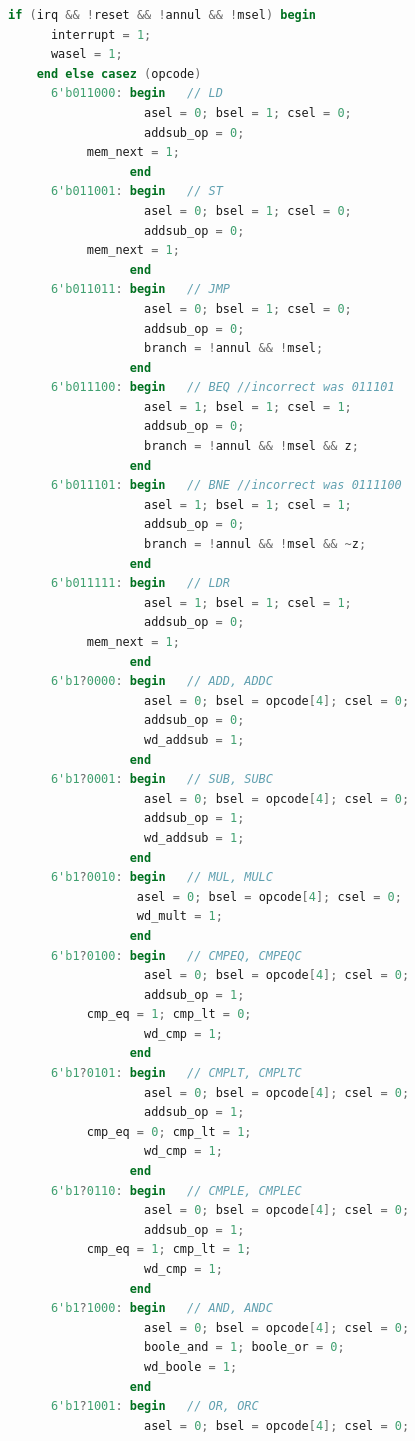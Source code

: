 \documentclass{article}
\begin{document}
\begin{lstlisting}[language=Verilog]
    if (irq && !reset && !annul && !msel) begin
      interrupt = 1;
      wasel = 1;
    end else casez (opcode)
      6'b011000: begin   // LD
                   asel = 0; bsel = 1; csel = 0;
                   addsub_op = 0;
		   mem_next = 1;
                 end
      6'b011001: begin   // ST
                   asel = 0; bsel = 1; csel = 0;
                   addsub_op = 0;
		   mem_next = 1;
                 end
      6'b011011: begin   // JMP
                   asel = 0; bsel = 1; csel = 0;
                   addsub_op = 0;
                   branch = !annul && !msel;
                 end
      6'b011100: begin   // BEQ //incorrect was 011101
                   asel = 1; bsel = 1; csel = 1;
                   addsub_op = 0;
                   branch = !annul && !msel && z;
                 end
      6'b011101: begin   // BNE //incorrect was 0111100
                   asel = 1; bsel = 1; csel = 1;
                   addsub_op = 0;
                   branch = !annul && !msel && ~z;
                 end
      6'b011111: begin   // LDR
                   asel = 1; bsel = 1; csel = 1;
                   addsub_op = 0;
		   mem_next = 1;
                 end
      6'b1?0000: begin   // ADD, ADDC
                   asel = 0; bsel = opcode[4]; csel = 0;
                   addsub_op = 0;
                   wd_addsub = 1;
                 end
      6'b1?0001: begin   // SUB, SUBC
                   asel = 0; bsel = opcode[4]; csel = 0;
                   addsub_op = 1;
                   wd_addsub = 1;
                 end
      6'b1?0010: begin   // MUL, MULC
                  asel = 0; bsel = opcode[4]; csel = 0;
                  wd_mult = 1;
                 end
      6'b1?0100: begin   // CMPEQ, CMPEQC
                   asel = 0; bsel = opcode[4]; csel = 0;
                   addsub_op = 1;
		   cmp_eq = 1; cmp_lt = 0;
                   wd_cmp = 1;
                 end
      6'b1?0101: begin   // CMPLT, CMPLTC
                   asel = 0; bsel = opcode[4]; csel = 0;
                   addsub_op = 1;
		   cmp_eq = 0; cmp_lt = 1;
                   wd_cmp = 1;
                 end
      6'b1?0110: begin   // CMPLE, CMPLEC
                   asel = 0; bsel = opcode[4]; csel = 0;
                   addsub_op = 1;
		   cmp_eq = 1; cmp_lt = 1;
                   wd_cmp = 1;
                 end
      6'b1?1000: begin   // AND, ANDC
                   asel = 0; bsel = opcode[4]; csel = 0;
                   boole_and = 1; boole_or = 0;
                   wd_boole = 1;
                 end
      6'b1?1001: begin   // OR, ORC
                   asel = 0; bsel = opcode[4]; csel = 0;

\end{lstlisting}
\end{document}
